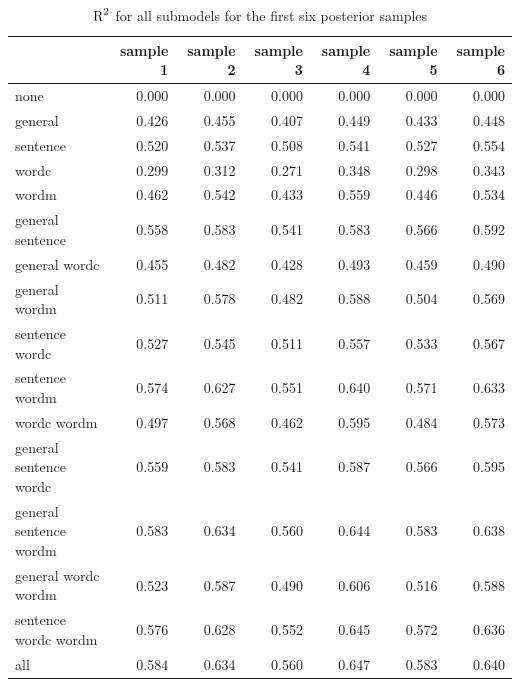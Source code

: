 \documentclass[11pt,a4paper,twoside]{book}
\newenvironment{knitrout}{}{} %
\begin{document}
\begin{knitrout}
\color{fgcolor}\begin{table}

\caption{\label{tab:empirical.data.postsample3}$ \text{R}^2$ for all submodels for the first six posterior samples}
\centering
\begin{tabular}[t]{lrrrrrr}
\toprule
  & sample 1 & sample 2 & sample 3 & sample 4 & sample 5 & sample 6\\
\midrule
none & 0.000 & 0.000 & 0.000 & 0.000 & 0.000 & 0.000\\
general & 0.426 & 0.455 & 0.407 & 0.449 & 0.433 & 0.448\\
sentence & 0.520 & 0.537 & 0.508 & 0.541 & 0.527 & 0.554\\
wordc & 0.299 & 0.312 & 0.271 & 0.348 & 0.298 & 0.343\\
wordm & 0.462 & 0.542 & 0.433 & 0.559 & 0.446 & 0.534\\
general sentence & 0.558 & 0.583 & 0.541 & 0.583 & 0.566 & 0.592\\
general wordc & 0.455 & 0.482 & 0.428 & 0.493 & 0.459 & 0.490\\
general wordm & 0.511 & 0.578 & 0.482 & 0.588 & 0.504 & 0.569\\
sentence wordc & 0.527 & 0.545 & 0.511 & 0.557 & 0.533 & 0.567\\
sentence wordm & 0.574 & 0.627 & 0.551 & 0.640 & 0.571 & 0.633\\
wordc wordm & 0.497 & 0.568 & 0.462 & 0.595 & 0.484 & 0.573\\
general sentence wordc & 0.559 & 0.583 & 0.541 & 0.587 & 0.566 & 0.595\\
general sentence wordm & 0.583 & 0.634 & 0.560 & 0.644 & 0.583 & 0.638\\
general wordc wordm & 0.523 & 0.587 & 0.490 & 0.606 & 0.516 & 0.588\\
sentence wordc wordm & 0.576 & 0.628 & 0.552 & 0.645 & 0.572 & 0.636\\
all & 0.584 & 0.634 & 0.560 & 0.647 & 0.583 & 0.640\\
\bottomrule
\end{tabular}
\end{table}


\end{knitrout}
\end{document}
